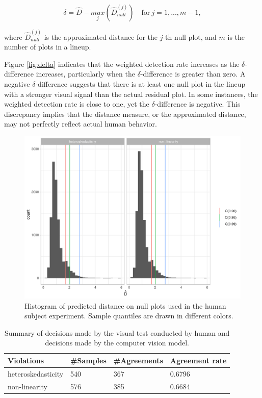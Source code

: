 \documentclass[]{interact}
\theoremstyle{plain}%
\theoremstyle{definition}
\theoremstyle{remark}
\begin{document}
\begin{equation}
\delta = \hat{D} - \underset{j}{max}\left(\hat{D}_{null}^{(j)}\right) \quad \text{for}~j = 1,...,m-1,
\end{equation}

\noindent where \(\hat{D}_{null}^{(j)}\) is the approximated distance
for the \(j\)-th null plot, and \(m\) is the number of plots in a
lineup.

Figure \ref{fig:delta} indicates that the weighted detection rate
increases as the \(\delta\)-difference increases, particularly when the
\(\delta\)-difference is greater than zero. A negative
\(\delta\)-difference suggests that there is at least one null plot in
the lineup with a stronger visual signal than the actual residual plot.
In some instances, the weighted detection rate is close to one, yet the
\(\delta\)-difference is negative. This discrepancy implies that the
distance measure, or the approximated distance, may not perfectly
reflect actual human behavior.

\begin{figure}[!h]

{\centering \includegraphics[width=1\linewidth]{paper_files/figure-latex/hist-null-human-1} 

}

\caption{Histogram of predicted distance on null plots used in the human subject experiment. Sample quantiles are drawn in different colors.}\label{fig:hist-null-human}
\end{figure}

\begin{table}

\caption{\label{tab:human-table}Summary of decisions made by the visual test conducted by human and decisions made by the computer vision model.}
\centering
\begin{tabular}[t]{llll}
\toprule
Violations & \#Samples & \#Agreements & Agreement rate\\
\midrule
heteroskedasticity & 540 & 367 & 0.6796\\
non-linearity & 576 & 385 & 0.6684\\
\bottomrule
\end{tabular}
\end{table}
\end{document}

